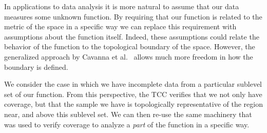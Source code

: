 In applications to data analysis it is more natural to assume that our data measures some unknown function.
By requiring that our function is related to the metric of the space in a specific way we can replace this requirement with assumptions about the function itself.
Indeed, these assumptions could relate the behavior of the function to the topological boundary of the space.
However, the generalized approach by Cavanna et al.~\cite{cavanna2017when} allows much more freedom in how the boundary is defined.


We consider the case in which we have incomplete data from a particular sublevel set of our function.
From this perspective, the TCC verifies that we not only have coverage, but that the sample we have is topologically representative of the region near, and above this sublevel set.
We can then re-use the same machinery that was used to verify coverage to analyze a \emph{part} of the function in a specific way.

%

